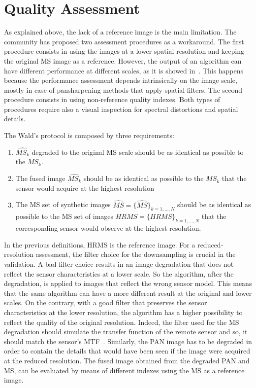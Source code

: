 \documentclass[12pt]{report}
\begin{document}
\section{Quality Assessment}
As explained above, the lack of a reference image is the main limitation. The community has proposed two assessment
procedures as a workaround. The first procedure consists in using the images at a lower spatial 
resolution and keeping the original MS image as a reference. However, the output of an algorithm can have 
different performance at different scales, as it is showed in~\cite{perfdiffscale}.
This happens because the performance assessment depends intrinsically on the image scale, 
mostly in case of pansharpening methods that apply spatial filters.
The second procedure consists in using non-reference quality indexes. 
Both types of procedures require also a visual inspection for spectral distortions and spatial details.

The Wald's protocol is composed by three requirements:
\begin{enumerate}
	\item $\widehat{MS_k}$ degraded to the original MS scale should be as identical as possible to the $MS_k$.
    \item The fused image $\widehat{MS_k}$ should be as identical as possible to the $MS_k$ that the sensor would acquire at the highest resolution
    \item The MS set of synthetic images $\widehat{MS} = {\{\widehat{MS}\}_{k=1,\dots,N}}$ should be as identical as possible
    to the MS set of images $HRMS = \{HRMS\}_{k=1,\dots,N}$ that the corresponding sensor would observe at the highest resolution.
\end{enumerate}

In the previous definitions, HRMS is the reference image.
For a reduced-resolution assessment, the filter choice for the downsampling is crucial in the validation. 
A bad filter choice results in an image degradation that does not reflect the 
sensor characteristics at a lower scale. So the algorithm, after the degradation, is applied to
images that reflect the wrong sensor model. This means that the same algorithm can have a more different result at the original and lower scales. On the contrary, with a good filter that preserves the sensor characteristics at the lower resolution, the algorithm has a higher  possibility to reflect the quality of the original resolution.
Indeed, the filter used for the MS degradation should simulate the transfer function of the remote sensor and so, it should match the sensor's MTF~\cite{mtfsensor}. 
Similarly, the PAN image has to be degraded in order to contain the details that would have been seen if the image were acquired at the reduced resolution.
The fused image obtained from the degraded PAN and MS, can be evaluated by means of different indexes using the MS as a reference image.
\end{document}
